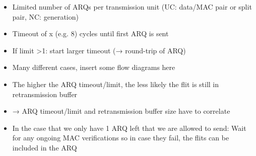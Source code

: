 \begin{itemize}
\begin{itemize}
            \item Limited number of ARQs per transmission unit (UC: data/MAC pair or split pair, NC: generation)
            \item Timeout of x (e.g. 8) cycles until first ARQ is sent
            \item If limit >1: start larger timeout (→ round-trip of ARQ)
            \item Many different cases, insert some flow diagrams here
            \item The higher the ARQ timeout/limit, the less likely the flit is still in retransmission buffer
            \item → ARQ timeout/limit and retransmission buffer size have to correlate
            \item In the case that we only have 1 ARQ left that we are allowed to send: Wait for any ongoing MAC verifications
                so in case they fail, the flits can be included in the ARQ
        \end{itemize}
\end{itemize}
\fi
